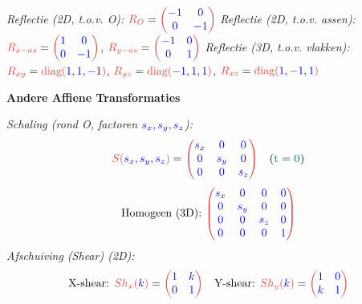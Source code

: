 \documentclass[12pt]{article}
\renewcommand{\vec}[1]{\textcolor{vectorTeal}{\mathbf{#1}}}
\newcommand{\scalar}[1]{\textcolor{scalarBrightBlue}{#1}}
\newcommand{\mat}[1]{\textcolor{matrixSoftRed}{#1}}
\begin{document}
\textit{Reflectie (2D, t.o.v. O):} $\mat{R_{O}} = \mat{\begin{pmatrix} \scalar{-1} & \scalar{0} \\ \scalar{0} & \scalar{-1} \end{pmatrix}}$
\textit{Reflectie (2D, t.o.v. assen):} $\mat{R_{x-as}} = \mat{\begin{pmatrix} \scalar{1} & \scalar{0} \\ \scalar{0} & \scalar{-1} \end{pmatrix}}$, $\mat{R_{y-as}} = \mat{\begin{pmatrix} \scalar{-1} & \scalar{0} \\ \scalar{0} & \scalar{1} \end{pmatrix}}$
\textit{Reflectie (3D, t.o.v. vlakken):} $\mat{R_{xy}} = \mat{\text{diag}(\scalar{1, 1, -1})}$, $\mat{R_{yz}} = \mat{\text{diag}(\scalar{-1, 1, 1})}$, $\mat{R_{xz}} = \mat{\text{diag}(\scalar{1, -1, 1})}$


\vspace{1.5em} %
{\centering
\textcolor{headerBrown}{\large\textbf{Andere Affiene Transformaties}}
\par
}%
\textit{Schaling (rond O, factoren $\scalar{s_x, s_y, s_z}$):}
\[
\mat{S(\scalar{s_x, s_y, s_z})} = \mat{\begin{pmatrix} \scalar{s_x} & \scalar{0} & \scalar{0} \\ \scalar{0} & \scalar{s_y} & \scalar{0} \\ \scalar{0} & \scalar{0} & \scalar{s_z} \end{pmatrix}}
\quad (\vec{t}=\vec{0})
\]
\[
\text{Homogeen (3D): } \mat{\begin{pmatrix} \scalar{s_x} & \scalar{0} & \scalar{0} & \scalar{0} \\ \scalar{0} & \scalar{s_y} & \scalar{0} & \scalar{0} \\ \scalar{0} & \scalar{0} & \scalar{s_z} & \scalar{0} \\ \scalar{0} & \scalar{0} & \scalar{0} & \scalar{1} \end{pmatrix}}
\]
\textit{Afschuiving (Shear) (2D):}
\[
\text{X-shear: } \mat{Sh_x(\scalar{k})} = \mat{\begin{pmatrix} \scalar{1} & \scalar{k} \\ \scalar{0} & \scalar{1} \end{pmatrix}}
\quad
\text{Y-shear: } \mat{Sh_y(\scalar{k})} = \mat{\begin{pmatrix} \scalar{1} & \scalar{0} \\ \scalar{k} & \scalar{1} \end{pmatrix}}
\]
\end{document}
